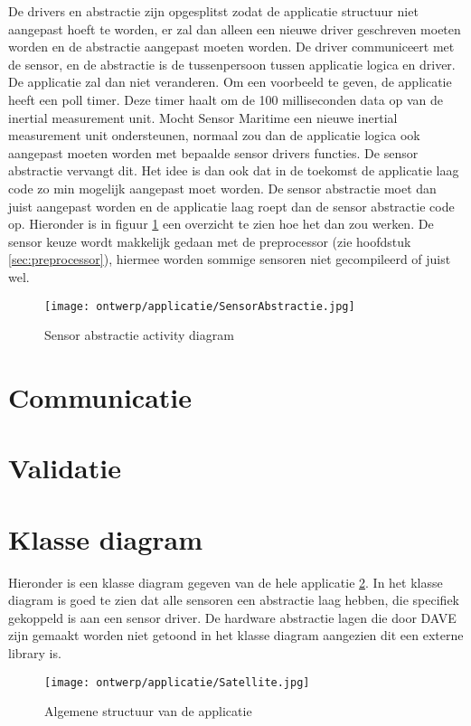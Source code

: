 \noindent De drivers en abstractie zijn opgesplitst zodat de applicatie structuur niet aangepast hoeft te worden, er zal dan alleen een nieuwe driver geschreven moeten worden en de abstractie aangepast moeten worden. De driver communiceert met de sensor, en de abstractie is de tussenpersoon tussen applicatie logica en driver. De applicatie zal dan niet veranderen. Om een voorbeeld te geven, de applicatie heeft een poll timer. Deze timer haalt om de 100 milliseconden data op van de inertial measurement unit. Mocht Sensor Maritime een nieuwe inertial measurement unit ondersteunen, normaal zou dan de applicatie logica ook aangepast moeten worden met bepaalde sensor drivers functies. De sensor abstractie vervangt dit. Het idee is dan ook dat in de toekomst de applicatie laag code zo min mogelijk aangepast moet worden. De sensor abstractie moet dan juist aangepast worden en de applicatie laag roept dan de sensor abstractie code op. Hieronder is in figuur \ref{fig:SensorAbstractie} een overzicht te zien hoe het dan zou werken. De sensor keuze wordt makkelijk gedaan met de preprocessor (zie hoofdstuk \ref{sec:preprocessor}), hiermee worden sommige sensoren niet gecompileerd of juist wel.
\begin{figure}[h!]
	\centering
	\label{fig:SensorAbstractie}

	\texttt{[image: ontwerp/applicatie/SensorAbstractie.jpg]}
	\caption{Sensor abstractie activity diagram}
\end{figure}
	
	
\newpage
\section{Communicatie}

\newpage

\newpage
\section{Validatie}


\newpage
\section{Klasse diagram}
Hieronder is een klasse diagram gegeven van de hele applicatie \ref{fig:klassediagram}. In het klasse diagram is goed te zien dat alle sensoren een abstractie laag hebben, die specifiek gekoppeld is aan een sensor  driver. De hardware abstractie lagen die door DAVE zijn gemaakt worden niet getoond in het klasse diagram aangezien dit een externe library is.
\begin{figure}[h!]
	\centering
	\label{fig:klassediagram}

	\texttt{[image: ontwerp/applicatie/Satellite.jpg]}
	\caption{Algemene structuur van de applicatie}
\end{figure}
